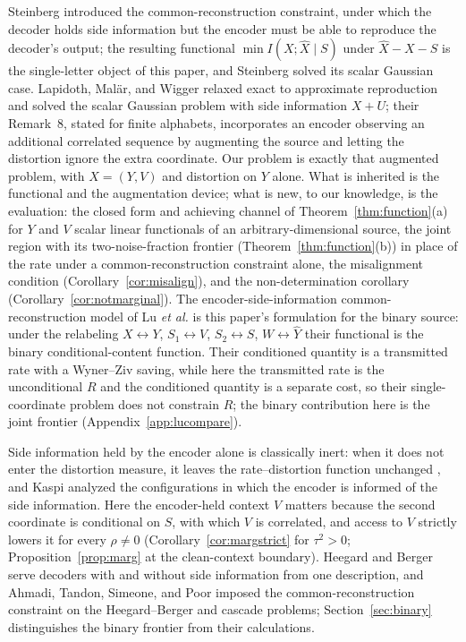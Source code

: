 \documentclass[11pt,onecolumn]{IEEEtran}
\newcommand{\hX}{\widehat{X}}
\newcommand{\hY}{\widehat{Y}}
\begin{document}
Steinberg \cite{steinberg2009} introduced the common-reconstruction
constraint, under which the decoder holds side information but the
encoder must be able to reproduce the decoder's output; the resulting
functional $\min I(X;\hX\mid S)$ under $\hX-X-S$ is the single-letter
object of this paper, and Steinberg solved its scalar Gaussian case.
Lapidoth, Mal\"ar, and Wigger \cite{lapidoth2014} relaxed exact to
approximate reproduction and solved the scalar Gaussian problem with
side information $X+U$; their Remark~8, stated for finite alphabets,
incorporates an encoder observing an additional correlated sequence by
augmenting the source and letting the distortion ignore the extra
coordinate. Our problem is exactly that augmented problem, with
$X=(Y,V)$ and distortion on $Y$ alone. What is inherited is the
functional and the augmentation device; what is new, to our knowledge,
is the evaluation: the closed form and achieving channel of
Theorem~\ref{thm:function}(a) for $Y$ and $V$ scalar linear functionals
of an arbitrary-dimensional source, the joint region with its
two-noise-fraction frontier (Theorem~\ref{thm:function}(b)) in place of
the rate under a common-reconstruction constraint alone, the
misalignment condition (Corollary~\ref{cor:misalign}), and the
non-determination corollary (Corollary~\ref{cor:notmarginal}). The
encoder-side-information common-reconstruction model of Lu \emph{et al.}
\cite{lu2016lossy,lu2016binary} is this paper's formulation for the
binary source: under the relabeling $X\leftrightarrow Y$,
$S_1\leftrightarrow V$, $S_2\leftrightarrow S$, $W\leftrightarrow\hY$
their functional is the binary conditional-content function. Their
conditioned quantity is a transmitted rate with a Wyner--Ziv saving,
while here the transmitted rate is the unconditional $R$ and the
conditioned quantity is a separate cost, so their single-coordinate
problem does not constrain $R$; the binary contribution here is the
joint frontier (Appendix~\ref{app:lucompare}).

Side information held by the encoder alone is classically inert: when
it does not enter the distortion measure, it leaves the rate--distortion
function unchanged \cite{berger1971}, and Kaspi \cite{kaspi1994}
analyzed the configurations in which the encoder is informed of the
side information. Here the encoder-held context $V$ matters because the
second coordinate is conditional on $S$, with which $V$ is correlated,
and access to $V$ strictly lowers it for every $\rho\ne0$
(Corollary~\ref{cor:margstrict} for $\tau^2>0$;
Proposition~\ref{prop:marg} at the clean-context boundary). Heegard and Berger
\cite{heegardberger1985} serve decoders with and without side
information from one description, and Ahmadi, Tandon, Simeone, and
Poor \cite{ahmadi2013} imposed the common-reconstruction constraint on
the Heegard--Berger and cascade problems; Section~\ref{sec:binary}
distinguishes the binary frontier from their calculations.
\end{document}
